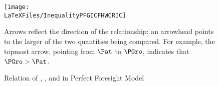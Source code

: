 \hypertarget{InequalityPFGICFHWCRIC}{}
\begin{figure}[h]
  \label{fig:InequalityPFGICFHWCRIC}
  \centerline{
    \texttt{[image: \\LaTeXFiles/InequalityPFGICFHWCRIC]}
  }
  \caption{Relation of {\RIC}, {\PFGIC}, and {\FHWC} in Perfect Foresight Model}
  \footnotesize{Arrows reflect the direction of the relationship; an arrowhead points to the larger of the two quantities being compared.  For example, the topmost arrow, pointing from $\Pat$ to $\PGro$, indicates that $\PGro > \Pat$.}
\end{figure}
